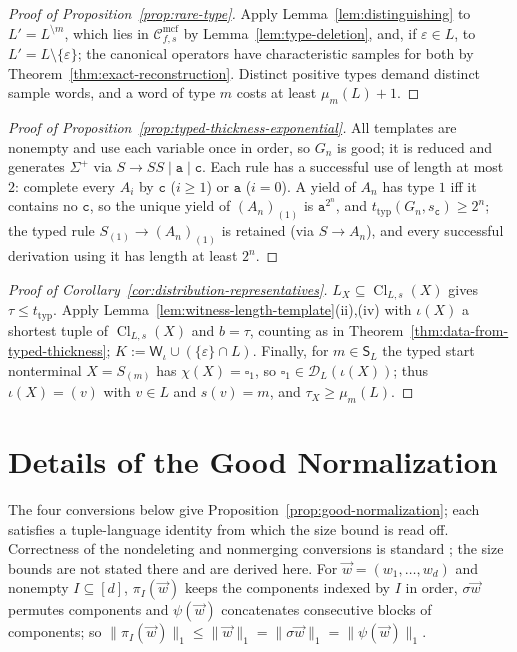 \documentclass[11pt]{article}
\numberwithin{equation}{section}
\theoremstyle{plain}
\theoremstyle{definition}
\theoremstyle{remark}
\newcommand{\Wit}{\mathsf{W}}
\newcommand{\Cmcf}[2]{\mathcal{C}^{\mathrm{mcf}}_{#1,#2}}
\newcommand{\D}{\mathcal{D}}
\newcommand{\tuple}[1]{\vec{#1}}
\newcommand{\blank}{\square}
\newcommand{\eps}{\varepsilon}
\theoremstyle{plain}
\begin{document}
\begin{proof}[Proof of Proposition~\ref{prop:rare-type}]
Apply Lemma~\ref{lem:distinguishing} to $L'=L^{\setminus m}$, which lies in
$\Cmcf{f}{s}$ by Lemma~\ref{lem:type-deletion}, and, if $\eps\in L$, to
$L'=L\setminus\{\eps\}$; the canonical operators have characteristic samples for
both by Theorem~\ref{thm:exact-reconstruction}.  Distinct positive types demand
distinct sample words, and a word of type $m$ costs at least $\mu_m(L)+1$.
\end{proof}

\begin{proof}[Proof of Proposition~\ref{prop:typed-thickness-exponential}]
All templates are nonempty and use each variable once in order, so $G_n$ is
good; it is reduced and generates $\Sigma^+$ via $S\to SS\mid\mathtt a\mid\mathtt c$.
Each rule has a successful use of length at most $2$: complete every $A_i$ by
$\mathtt c$ ($i\ge1$) or $\mathtt a$ ($i=0$).  A yield of $A_n$ has type $1$ iff it
contains no $\mathtt c$, so the unique yield of $(A_n)_{(1)}$ is $\mathtt a^{2^n}$,
and $t_{\mathrm{typ}}(G_n,s_{\mathtt c})\ge2^n$; the typed rule
$S_{(1)}\to(A_n)_{(1)}$ is retained (via $S\to A_n$), and every successful
derivation using it has length at least $2^n$.
\end{proof}

\begin{proof}[Proof of Corollary~\ref{cor:distribution-representatives}]
$L_X\subseteq\operatorname{Cl}_{L,s}(X)$ gives $\tau\le t_{\mathrm{typ}}$.  Apply
Lemma~\ref{lem:witness-length-template}(ii),(iv) with $\iota(X)$ a shortest tuple of
$\operatorname{Cl}_{L,s}(X)$ and $b=\tau$, counting as in
Theorem~\ref{thm:data-from-typed-thickness}; $K:=\Wit_\iota\cup(\{\eps\}\cap L)$.
Finally, for $m\in \mathsf S_L$ the typed start nonterminal $X=S_{(m)}$ has
$\chi(X)=\blank_1$, so $\blank_1\in\D_L(\iota(X))$; thus $\iota(X)=(v)$ with
$v\in L$ and $s(v)=m$, and $\tau_X\ge\mu_m(L)$.
\end{proof}

\section{Details of the Good Normalization}
\label{app:normalization-details}

The four conversions below give Proposition~\ref{prop:good-normalization}; each satisfies
a tuple-language identity from which the size bound is read off.  Correctness of the
nondeleting and nonmerging conversions is standard
\cite{SekiEtAl1991,Kanazawa2019Ogden,Yoshinaka2011}; the size bounds are not stated
there and are derived here.  For
$\tuple w=(w_1,\ldots,w_d)$ and nonempty $I\subseteq[d]$, $\pi_I(\tuple w)$ keeps the
components indexed by $I$ in order, $\sigma\tuple w$ permutes components and
$\psi(\tuple w)$ concatenates consecutive blocks of components; so
$\|\pi_I(\tuple w)\|_1\le\|\tuple w\|_1=\|\sigma\tuple w\|_1=\|\psi(\tuple w)\|_1$.
\end{document}
